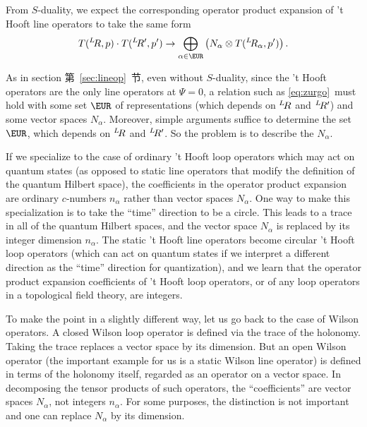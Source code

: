 From $S$-duality, we expect the corresponding operator
product expansion of 't Hooft line operators to take the same form
\setcounter{equation}{22}
\begin{equation}\label{eq:zurgo}
T({}^L\negthinspace R,p)\cdot T({}^L\negthinspace
R',p')\to \bigoplus_{\alpha\in \EUR}\left(N_\alpha \otimes T({}^L\negthinspace
R_\alpha,p')\right).
\end{equation}

As  in section 第~\ref{sec:lineop}~节, even without $S$-duality,  since the 't
Hooft operators are the only line operators at $\Psi=0$, a
relation such as \eqref{eq:zurgo}\ must hold with some set $\EUR$ of
representations (which depends on $^L\negthinspace R$ and
$^L\negthinspace R'$) and some vector spaces $N_\alpha$. Moreover,
simple arguments suffice to determine the set $\EUR$, which
depends on $^L\negthinspace R$ and $^L\negthinspace R'$. So the
problem is to describe the  $N_\alpha$.

If we specialize to the case of ordinary 't Hooft loop operators which may act on quantum states (as
opposed to static line
operators that modify the definition of the quantum Hilbert space), the coefficients in the operator
product expansion are ordinary $c$-numbers $n_\alpha$ rather than vector spaces $N_\alpha$.
One way to make this specialization is to take the ``time'' direction to be a circle.  This leads
to a trace in all of the quantum Hilbert spaces, and the vector space $N_\alpha$ is replaced by its
integer dimension $n_\alpha$.  The static 't Hooft line operators become circular 't Hooft loop operators
(which can act on quantum states if we interpret a different direction as the ``time'' direction
for quantization), and we learn that the operator product expansion coefficients
of 't Hooft loop operators, or of any loop operators in a topological field theory, are integers.

To make the point in a slightly different way, let us go back to the case of Wilson operators.
A closed Wilson loop operator is defined via the trace of the holonomy.
Taking the trace replaces a vector
space by its dimension.  But an open Wilson operator (the important example for us is a static Wilson
line operator) is defined in terms of the holonomy itself,
regarded as an operator on a vector space.  In decomposing the tensor products of such operators,
the ``coefficients'' are vector spaces $N_\alpha$, not integers $n_\alpha$.  For some purposes,
the distinction is not important and one can replace $N_\alpha$ by its dimension.

